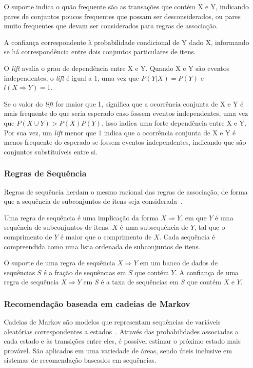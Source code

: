 O suporte indica o quão frequente são as transações que contém X e Y, indicando
pares de conjuntos poucos frequentes que possam ser desconsiderados, ou pares
muito frequentes que devam ser considerados para regras de associação.

A confiança correspondente à probabilidade condicional de Y dado X, informando
se há correspondência entre dois conjuntos particulares de itens.

O \textit{lift} avalia o grau de dependência entre X e Y. Quando X e Y são
eventos independentes, o \textit{lift} é igual a 1, uma vez que $P(Y|X) = P(Y)$ e $l(X
\Rightarrow Y) = 1$.

Se o valor do \textit{lift} for maior que 1, significa que a
ocorrência conjunta de X e Y é mais frequente do que seria esperado caso fossem
eventos independentes, uma vez que $P(X \cup Y) > P(X)P(Y)$. Isso indica uma
forte dependência entre X e Y. Por sua vez, um \textit{lift}  menor que 1 indica
que a ocorrência conjunta de X e Y é menos frequente do esperado se fossem
eventos independentes, indicando que são conjuntos substituíveis entre si.

\subsubsection{Regras de Sequência}
Regras de sequência herdam o mesmo racional das regras de associação, de forma
que a sequência de subconjuntos de itens seja considerada~\cite{liu2007web}.

Uma regra de sequência é uma implicação da forma $X \Rightarrow Y$, em que $Y$ é
uma sequência de subconjuntos de itens. $X$ é uma subsequência de $Y$, tal que o
comprimento de $Y$ é maior que o comprimento de $X$. Cada sequência é
compreendida como uma lista ordenada de subconjuntos de itens.

O suporte de uma regra de sequência $X \Rightarrow Y$ em um banco de dados de
sequências $S$ é a fração de sequências em $S$ que contém $Y$. A confiança de
uma regra de sequência $X \Rightarrow Y$ em $S$ é a taxa de sequências em
$S$ que contém $X$ e $Y$.
    
\subsubsection{Recomendação baseada em cadeias de Markov}
Cadeias de Markov são modelos que representam sequências de variáveis aleatórias
correspondentes a estados~\cite{ching2006markov}. Através das probabilidades
associadas a cada estado e às transições entre eles, é possível estimar o
próximo estado mais provável. São aplicados em uma variedade de áreas, sendo
úteis inclusive em sistemas de recomendação baseados em sequências.


